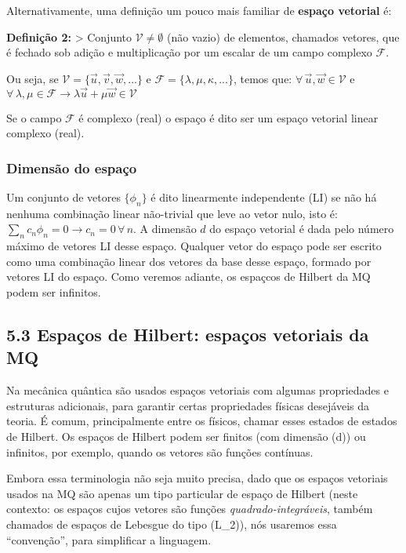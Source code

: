\documentclass[11pt]{article}
\begin{document}
Alternativamente, uma definição um pouco mais familiar de \textbf{espaço
vetorial} é:

\textbf{Definição 2:} \textgreater{} Conjunto
\(\mathcal{V}\ne\emptyset\) (não vazio) de elementos, chamados vetores,
que é fechado sob adição e multiplicação por um escalar de um campo
complexo \(\mathcal{F}\).

Ou seja, se \(\mathcal{V}=\{\vec{u},\vec{v},\vec{w},...\}\) e
\(\mathcal{F}=\{\lambda,\mu,\kappa,...\}\), temos que:
\(\forall\, \vec{u},\vec{w}\in \mathcal{V}\) e
\(\forall\, \lambda,\mu \in \mathcal{F} \rightarrow \lambda\vec{u}+\mu\vec{w} \in \mathcal{V}\)

Se o campo \(\mathcal{F}\) é complexo (real) o espaço é dito ser um
espaço vetorial linear complexo (real).

\hypertarget{dimensuxe3o-do-espauxe7o}{%
\subsubsection{Dimensão do espaço}\label{dimensuxe3o-do-espauxe7o}}

Um conjunto de vetores \(\{\phi_n \}\) é dito linearmente independente
(LI) se não há nenhuma combinação linear não-trivial que leve ao vetor
nulo, isto é:
\(\sum_n c_n \phi_n = 0 \rightarrow c_n = 0\, \forall\, n\). A dimensão
\(d\) do espaço vetorial é dada pelo número máximo de vetores LI desse
espaço. Qualquer vetor do espaço pode ser escrito como uma combinação
linear dos vetores da base desse espaço, formado por vetores LI do
espaço. Como veremos adiante, os espaçcos de Hilbert da MQ podem ser
infinitos.

\hypertarget{espauxe7os-de-hilbert-espauxe7os-vetoriais-da-mq}{%
\subsection{5.3 Espaços de Hilbert: espaços vetoriais da
MQ}\label{espauxe7os-de-hilbert-espauxe7os-vetoriais-da-mq}}

Na mecânica quântica são usados espaços vetoriais com algumas
propriedades e estruturas adicionais, para garantir certas propriedades
físicas desejáveis da teoria. É comum, principalmente entre os físicos,
chamar esses estados de estados de Hilbert. Os espaços de Hilbert podem
ser finitos (com dimensão (d)) ou infinitos, por exemplo, quando os
vetores são funções contínuas.

Embora essa terminologia não seja muito precisa, dado que os espaços
vetoriais usados na MQ são apenas um tipo particular de espaço de
Hilbert (neste contexto: os espaços cujos vetores são funções
\emph{quadrado-integráveis}, também chamados de espaços de Lebesgue do
tipo (L\_2)), nós usaremos essa ``convenção'', para simplificar a
linguagem.
\end{document}
